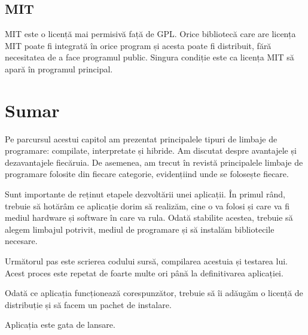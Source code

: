 \subsection{MIT}
\label{sec:appdev-licensing-mit}

MIT  este o licență mai
permisivă față de GPL. Orice bibliotecă care are licența MIT poate fi integrată
în orice program și acesta poate fi distribuit, fără necesitatea de a face
programul public. Singura condiție este ca licența MIT să apară în programul
principal.

\section{Sumar}
\label{sec:appdev-summary}

Pe parcursul acestui capitol am prezentat principalele tipuri de limbaje de
programare: compilate, interpretate și hibride. Am discutat despre avantajele și
dezavantajele fiecăruia. De asemenea, am trecut în revistă principalele limbaje
de programare folosite din fiecare categorie, evidențiind unde se folosește
fiecare.

Sunt importante de reținut etapele dezvoltării unei aplicații. În primul rând,
trebuie să hotărâm ce aplicație dorim să realizăm, cine o va folosi și care va
fi mediul hardware și software în care va rula. Odată stabilite acestea, trebuie
să alegem limbajul potrivit, mediul de programare și să instalăm bibliotecile
necesare.

Următorul pas este scrierea codului sursă, compilarea acestuia și testarea lui.
Acest proces este repetat de foarte multe ori până la definitivarea aplicației.

Odată ce aplicația funcționează corespunzător, trebuie să îi adăugăm o licență
de distribuție și să facem un pachet de instalare.

Aplicația este gata de lansare.
